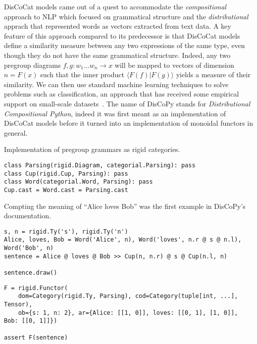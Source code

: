DisCoCat models came out of a quest to accommodate the \emph{compositional} approach to NLP which focused on grammatical structure and the \emph{distributional} apprach that represented words as vectors extracted from text data.
A key feature of this approach compared to its predecessor is that DisCoCat models define a similarity measure between any two expressions of the same type, even though they do not have the same grammatical structure.
Indeed, any two pregroup diagrams $f, g : w_1 \dots w_n \to x$ will be mapped to vectors of dimension $n = F(x)$ such that the inner product $\langle F(f) \vert F(g) \rangle$ yields a measure of their similarity.
We can then use standard machine learning techniques to solve problems such as classification, an approach that has received some empirical support on small-scale datasets~\cite{GrefenstetteSadrzadeh11}.
The name of DisCoPy stands for \emph{Distributional Compositional Python}, indeed it was first meant as an implementation of DisCoCat models before it turned into an implementation of monoidal functors in general.

\begin{python}
{\normalfont Implementation of pregroup grammars as rigid categories.}

\begin{verbatim}
class Parsing(rigid.Diagram, categorial.Parsing): pass
class Cup(rigid.Cup, Parsing): pass
class Word(categorial.Word, Parsing): pass
Cup.cast = Word.cast = Parsing.cast
\end{verbatim}
\end{python}

\begin{example}\label{example:alice-loves-bob}
Compting the meaning of ``Alice loves Bob'' was the first example in DisCoPy's documentation.

\begin{verbatim}
s, n = rigid.Ty('s'), rigid.Ty('n')
Alice, loves, Bob = Word('Alice', n), Word('loves', n.r @ s @ n.l), Word('Bob', n)
sentence = Alice @ loves @ Bob >> Cup(n, n.r) @ s @ Cup(n.l, n)

sentence.draw()
\end{verbatim}


\begin{verbatim}
F = rigid.Functor(
    dom=Category(rigid.Ty, Parsing), cod=Category(tuple[int, ...], Tensor),
    ob={s: 1, n: 2}, ar={Alice: [[1, 0]], loves: [[0, 1], [1, 0]], Bob: [[0, 1]]})

assert F(sentence)
\end{verbatim}
\end{example}
